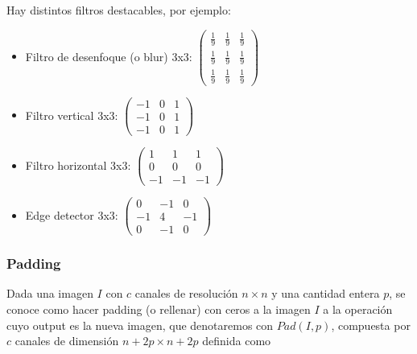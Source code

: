\documentclass{article}
\begin{document}
Hay distintos filtros destacables, por ejemplo:
\begin{itemize}
\item Filtro de desenfoque (o blur) 3x3: $\begin{pmatrix}
\frac{1}{9} & \frac{1}{9} & \frac{1}{9}\\
\frac{1}{9} & \frac{1}{9} & \frac{1}{9}\\
\frac{1}{9} & \frac{1}{9} & \frac{1}{9}
\end{pmatrix}$

\item Filtro vertical 3x3: $\begin{pmatrix}
-1 & 0 & 1\\
-1 & 0 & 1\\
-1 & 0 & 1
\end{pmatrix}$

\item Filtro horizontal 3x3: $\begin{pmatrix}
1 & 1 & 1\\
0 & 0 & 0\\
-1 & -1 & -1
\end{pmatrix}$

\item Edge detector 3x3: $\begin{pmatrix}
0 & -1 & 0\\
-1 & 4 & -1\\
0 & -1 & 0
\end{pmatrix}$


\end{itemize}



\subsubsection{Padding}
Dada una imagen $I$ con $c$ canales de resolución $n\times n$ y una cantidad entera $p$, se conoce como hacer padding (o rellenar) con ceros a la imagen $I$ a la operación cuyo output es la nueva imagen, que denotaremos con $Pad(I,p)$, compuesta por $c$ canales de dimensión $n+2p\times n+2p$ definida como
\end{document}
